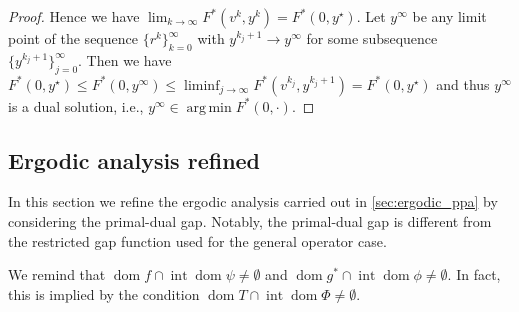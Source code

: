 \documentclass[11pt,onecolumn]{article}
\DeclareMathOperator*{\argmin}{arg\,min}
\DeclareMathOperator{\dom}{dom}
\DeclareMathOperator{\intr}{int}
\newcommand{\bR}{\mathbb{R}}
\theoremstyle{remark}
\begin{document}
\begin{proof}
Hence we have
$
\lim_{k \to \infty} F^*(v^k, y^k) = F^*(0, y^\star).
$
Let $y^\infty$ be any limit point of the sequence $\{r^{k}\}_{k=0}^\infty$ with $y^{k_j+1} \to y^\infty$ for some subsequence $\{y^{k_j+1}\}_{j=0}^\infty$. Then we have $F^*(0, y^\star) \leq F^*(0, y^\infty) \leq \liminf_{j \to \infty} F^*(v^{k_j}, y^{k_j+1}) = F^*(0, y^\star)$ and thus $y^\infty$ is a dual solution, i.e., $y^\infty \in \argmin F^*(0, \cdot)$. 
\end{proof}


\subsection{Ergodic analysis refined}
In this section we refine the ergodic analysis carried out in \cref{sec:ergodic_ppa} by considering the primal-dual gap. Notably, the primal-dual gap is different from the restricted gap function used for the general operator case.

We remind that $\dom f \cap \intr \dom \psi \neq \emptyset$ and $\dom g^*\cap \intr \dom \phi \neq \emptyset$. In fact, this is implied by the condition $\dom T \cap \intr \dom \Phi \neq \emptyset$.
\end{document}

